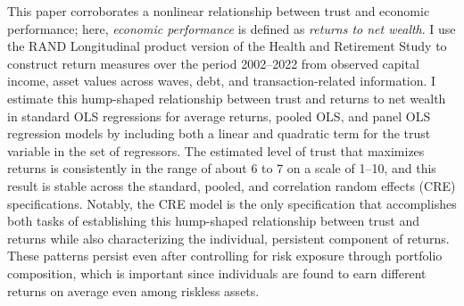 This paper corroborates a nonlinear relationship between trust and economic performance; here, \textit{economic performance} is defined as \textit{returns to net wealth}. I use the RAND Longitudinal product version of the Health and Retirement Study to construct return measures over the period 2002--2022 from observed capital income, asset values across waves, debt, and transaction-related information. I estimate this hump-shaped relationship between trust and returns to net wealth in standard OLS regressions for average returns, pooled OLS, and panel OLS regression models by including both a linear and quadratic term for the trust variable in the set of regressors. The estimated level of trust that maximizes returns is consistently in the range of about 6 to 7 on a scale of 1--10, and this result is stable across the standard, pooled, and correlation random effects (CRE) specifications. Notably, the CRE model is the only specification that accomplishes both tasks of establishing this hump-shaped relationship between trust and returns while also characterizing the individual, persistent component of returns. These patterns persist even after controlling for risk exposure through portfolio composition, which is important since individuals are found to earn different returns on average even among riskless assets. 
